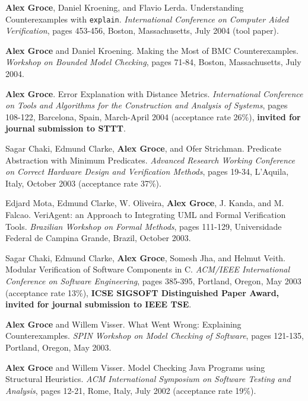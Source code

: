 \documentclass[ComputerScience]{vita}
\begin{document}
\begin{vita}
\begin{Refereed Conference and Workshop Publications}
\item
{\bf Alex Groce}, Daniel Kroening, and Flavio Lerda.
\newblock Understanding Counterexamples with {\tt explain}.
\newblock \emph{International Conference on Computer Aided Verification},  pages 453-456, Boston, Massachusetts, July 2004 (tool paper).

\item
{\bf Alex Groce} and Daniel Kroening.
\newblock Making the Most of BMC Counterexamples.
\newblock \emph{Workshop on Bounded Model Checking},  pages 71-84, Boston, Massachusetts, July 2004.


\item
{\bf Alex Groce}.
\newblock Error Explanation with Distance Metrics.
\newblock \emph{International Conference on Tools and Algorithms for the Construction and Analysis of Systems}, pages 108-122, Barcelona, Spain, March-April 2004 (acceptance rate 26\%), {\bf invited for journal submission to STTT}.

\item
Sagar Chaki, Edmund Clarke, {\bf Alex Groce}, and Ofer Strichman.
\newblock Predicate Abstraction with Minimum Predicates.
\newblock \emph{Advanced Research Working Conference on Correct Hardware Design and Verification Methods}, pages 19-34, L'Aquila, Italy, October 2003 (acceptance rate 37\%).

\item
Edjard Mota, Edmund Clarke, W. Oliveira, {\bf Alex Groce}, J. Kanda, and M. Falcao.
\newblock VeriAgent: an Approach to Integrating UML and Formal Verification Tools.
\newblock \emph{Brazilian Workshop on Formal Methods}, pages 111-129, Universidade Federal de Campina Grande, Brazil, October 2003.

\item 
Sagar Chaki, Edmund Clarke, {\bf Alex Groce}, Somesh Jha, and Helmut Veith.
\newblock Modular Verification of Software Components in C.
\newblock \emph{ACM/IEEE International Conference on Software Engineering}, pages 385-395, Portland, Oregon, May 2003 (acceptance rate 13\%), {\bf ICSE SIGSOFT Distinguished Paper Award, invited for journal submission to IEEE TSE}. 

\item
{\bf Alex Groce} and Willem Visser.
\newblock What Went Wrong: Explaining Counterexamples.
\newblock \emph{SPIN Workshop on Model Checking of Software}, pages 121-135, Portland, Oregon, May 2003.

\item
{\bf Alex Groce} and Willem Visser.
\newblock Model Checking Java Programs using Structural Heuristics.
\newblock \emph{ACM International Symposium on Software Testing and Analysis}, pages 12-21, Rome, Italy, July 2002 (acceptance rate 19\%).


\end{Refereed Conference and Workshop Publications}
\end{vita}
\end{document}
